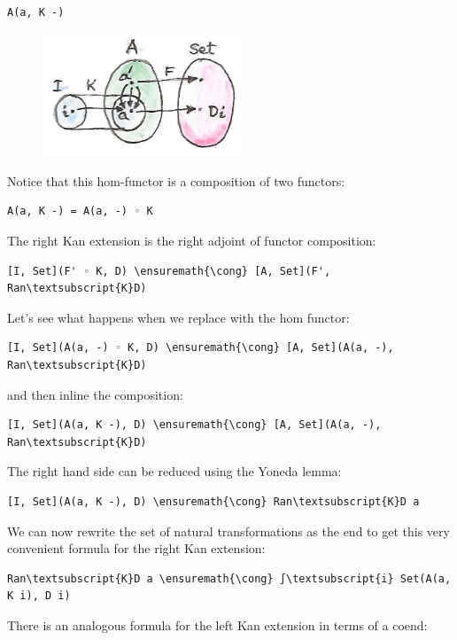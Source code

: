 \begin{verbatim}
A(a, K -)
\end{verbatim}

\begin{figure}[H]
\centering
\includegraphics[width=60mm]{images/kan13.jpg}
\end{figure}

\noindent
Notice that this hom-functor is a composition of two functors:

\begin{verbatim}
A(a, K -) = A(a, -) ◦ K
\end{verbatim}
The right Kan extension is the right adjoint of functor composition:

\begin{Verbatim}[commandchars=\\\{\}]
[I, Set](F' ◦ K, D) \ensuremath{\cong} [A, Set](F', Ran\textsubscript{K}D)
\end{Verbatim}
Let's see what happens when we replace  with the hom
functor:

\begin{Verbatim}[commandchars=\\\{\}]
[I, Set](A(a, -) ◦ K, D) \ensuremath{\cong} [A, Set](A(a, -), Ran\textsubscript{K}D)
\end{Verbatim}
and then inline the composition:

\begin{Verbatim}[commandchars=\\\{\}]
[I, Set](A(a, K -), D) \ensuremath{\cong} [A, Set](A(a, -), Ran\textsubscript{K}D)
\end{Verbatim}
The right hand side can be reduced using the Yoneda lemma:

\begin{Verbatim}[commandchars=\\\{\}]
[I, Set](A(a, K -), D) \ensuremath{\cong} Ran\textsubscript{K}D a
\end{Verbatim}
We can now rewrite the set of natural transformations as the end to get
this very convenient formula for the right Kan extension:

\begin{Verbatim}[commandchars=\\\{\}]
Ran\textsubscript{K}D a \ensuremath{\cong} ∫\textsubscript{i} Set(A(a, K i), D i)
\end{Verbatim}
There is an analogous formula for the left Kan extension in terms of a
coend:


